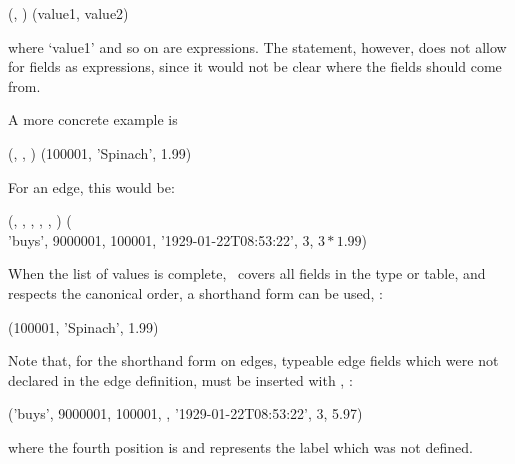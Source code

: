   
                      (,
                       )
                      (value1, value2)

where `value1' and so on are expressions.
The  statement, however,
does not allow for fields as expressions,
since it would not be clear where the fields
should come from.

A more concrete example is

  
                      (,
                       ,
                       )
                      (100001, 'Spinach', 1.99)

For an edge, this would be:

\begin{minipage}{\textwidth}
  
                      (,
                       ,
                       ,
                       ,
                       ,
                       )
                      (\\
\hspace*{2.99cm}       'buys', 9000001, 100001,
                       '1929-01-22T08:53:22',
                       3, $3\ast 1.99$)
\end{minipage}

When the list of values is complete,
\ie\ covers all fields in the type or table,
and respects the canonical order,
a shorthand form can be used, \eg:

  
                      (100001, 'Spinach', 1.99)

Note that, for the shorthand form on edges,
typeable edge fields which were not declared
in the edge definition, must be inserted with
, \eg:

\begin{minipage}{\textwidth}
  
                      ('buys', 9000001, 100001,
                       ,
                       '1929-01-22T08:53:22',
                       3, 5.97)
\end{minipage}

where the fourth position is  and represents
the label which was not defined.


